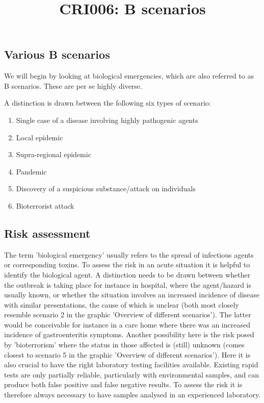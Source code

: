 \documentclass{article}
\begin{document}
\title{CRI006: B scenarios}

\maketitle


\subsection{Various B scenarios}\label{H9415283}



We will begin by looking at biological emergencies, which are also referred to as B scenarios. These are per se highly diverse.


A distinction is drawn between the following six types of scenario:

\begin{enumerate}
\item Single case of a disease involving highly pathogenic agents


\item Local epidemic


\item Supra-regional epidemic


\item Pandemic


\item Discovery of a suspicious substance/attack on individuals


\item Bioterrorist attack


\end{enumerate}

\subsection{Risk assessment}\label{H7128019}



The term 'biological emergency' usually refers to the spread of infectious agents or corresponding toxins. To assess the risk in an acute situation it is helpful to identify the biological agent. A distinction needs to be drawn between whether the outbreak is taking place for instance in hospital, where the agent/hazard is usually known, or whether the situation involves an increased incidence of disease with similar presentations, the cause of which is unclear (both most closely resemble scenario 2 in the graphic 'Overview of different scenarios'). The latter would be conceivable for instance in a care home where there was an increased incidence of gastroenteritis symptoms. Another possibility here is the risk posed by 'bioterrorism' where the status in those affected is (still) unknown (comes closest to scenario 5 in the graphic 'Overview of different scenarios'). Here it is also crucial to have the right laboratory testing facilities available. Existing rapid tests are only partially reliable, particularly with environmental samples, and can produce both false positive and false negative results. To assess the risk it is therefore always necessary to have samples analysed in an experienced laboratory.
\end{document}
